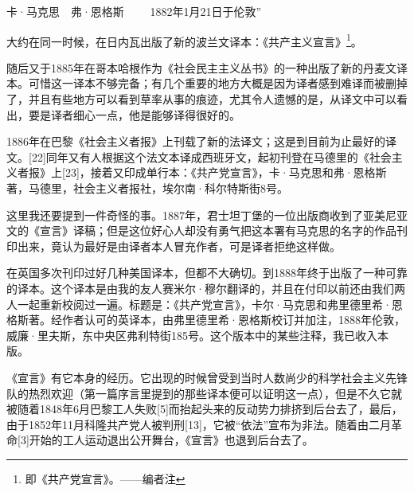 \documentclass[UTF8,zihao=-4,a4paper]{ctexart}
\begin{document}
卡·马克思　弗·恩格斯 
 　　1882年1月21日于伦敦”\par
大约在同一时候，在日内瓦出版了新的波兰文译本：《共产主义宣言》\footnote{即《共产党宣言》。——编者注}。\par
随后又于1885年在哥本哈根作为《社会民主主义丛书》的一种出版了新的丹麦文译本。可惜这一译本不够完备；有几个重要的地方大概是因为译者感到难译而被删掉了，并且有些地方可以看到草率从事的痕迹，尤其令人遗憾的是，从译文中可以看出，要是译者细心一点，他是能够译得很好的。\par
1886年在巴黎《社会主义者报》上刊载了新的法译文；这是到目前为止最好的译文。[22]同年又有人根据这个法文本译成西班牙文，起初刊登在马德里的《社会主义者报》上[23]，接着又印成单行本：《共产党宣言》，卡·马克思和弗·恩格斯著，马德里，社会主义者报社，埃尔南·科尔特斯街8号。\par
这里我还要提到一件奇怪的事。1887年，君士坦丁堡的一位出版商收到了亚美尼亚文的《宣言》译稿；但是这位好心人却没有勇气把这本署有马克思的名字的作品刊印出来，竟认为最好是由译者本人冒充作者，可是译者拒绝这样做。\par
在英国多次刊印过好几种美国译本，但都不大确切。到1888年终于出版了一种可靠的译本。这个译本是由我的友人赛米尔·穆尔翻译的，并且在付印以前还由我们两人一起重新校阅过一遍。标题是：《共产党宣言》，卡尔·马克思和弗里德里希·恩格斯著。经作者认可的英译本，由弗里德里希·恩格斯校订并加注，1888年伦敦，威廉·里夫斯，东中央区弗利特街185号。这个版本中的某些注释，我已收入本版。\par
《宣言》有它本身的经历。它出现的时候曾受到当时人数尚少的科学社会主义先锋队的热烈欢迎（第一篇序言里提到的那些译本便可以证明这一点），但是不久它就被随着1848年6月巴黎工人失败[5]而抬起头来的反动势力排挤到后台去了，最后，由于1852年11月科隆共产党人被判刑[13]，它被“依法”宣布为非法。随着由二月革命[3]开始的工人运动退出公开舞台，《宣言》也退到后台去了。\par
\end{document}
